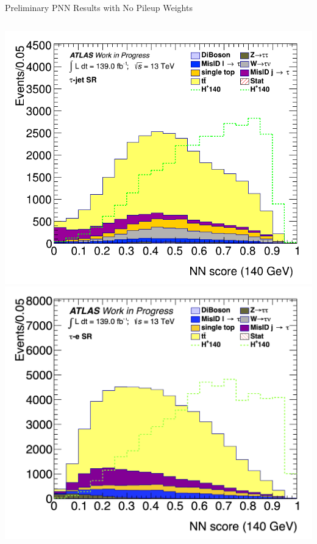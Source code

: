 \documentclass[aspectratio=169,xcolor=table]{beamer}
\begin{document}
\begin{frame}{Preliminary PNN Results with No Pileup Weights}
\begin{columns}
        \includegraphics[height=.24\textheight,keepaspectratio=true]{Scores/taujet/rnnTest_1p_3p_noweight/clf_score_GB200_mass_140to140_SR_TAUJET.png}
        \includegraphics[height=.24\textheight,keepaspectratio=true]{Scores/taulep/myOutDirClfEval_1p_noUpsilon_test_full/clf_score_GB200_mass_140to140_SR_TAUEL.png}

\end{columns}
\end{frame}
\end{document}
